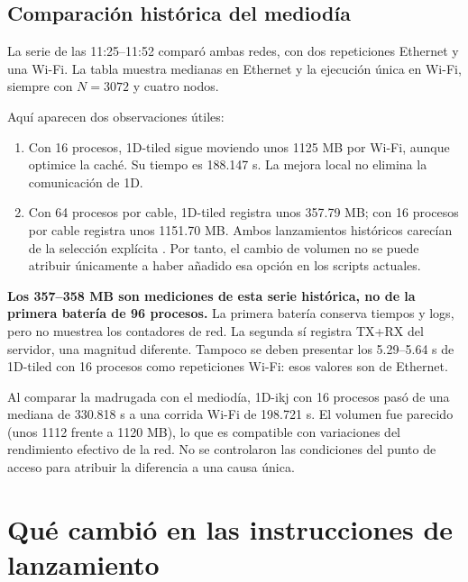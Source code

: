 \clearpage
\subsection{Comparación histórica del mediodía}
La serie de las 11:25--11:52 comparó ambas redes, con dos repeticiones Ethernet y una Wi-Fi. La tabla muestra medianas en Ethernet y la ejecución única en Wi-Fi, siempre con $N=3072$ y cuatro nodos.


Aquí aparecen dos observaciones útiles:
\begin{enumerate}
\item Con 16 procesos, 1D-tiled sigue moviendo unos 1125 MB por Wi-Fi, aunque optimice la caché. Su tiempo es 188.147 s. La mejora local no elimina la comunicación de 1D.
\item Con 64 procesos por cable, 1D-tiled registra unos 357.79 MB; con 16 procesos por cable registra unos 1151.70 MB. Ambos lanzamientos históricos carecían de la selección explícita . Por tanto, el cambio de volumen no se puede atribuir únicamente a haber añadido esa opción en los scripts actuales.
\end{enumerate}

\textbf{Los 357--358 MB son mediciones de esta serie histórica, no de la primera batería de 96 procesos.} La primera batería conserva tiempos y logs, pero no muestrea los contadores de red. La segunda sí registra TX+RX del servidor, una magnitud diferente. Tampoco se deben presentar los 5.29--5.64 s de 1D-tiled con 16 procesos como repeticiones Wi-Fi: esos valores son de Ethernet.

Al comparar la madrugada con el mediodía, 1D-ikj con 16 procesos pasó de una mediana de 330.818 s a una corrida Wi-Fi de 198.721 s. El volumen fue parecido (unos 1112 frente a 1120 MB), lo que es compatible con variaciones del rendimiento efectivo de la red. No se controlaron las condiciones del punto de acceso para atribuir la diferencia a una causa única.

\clearpage
\section{Qué cambió en las instrucciones de lanzamiento}

